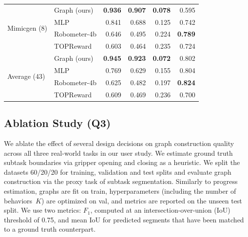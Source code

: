 \documentclass[letterpaper, 10 pt, conference]{ieeeconf}
\begin{document}
\begin{table}
\begin{tabular}{@{}llrrrr@{}}
  \midrule
  \multirow{4}{*}{Mimicgen (8)}      & Graph (ours) & \textbf{0.936} & \textbf{0.907} & \textbf{0.078} & 0.595 \\
                                     & MLP        & 0.841          & 0.688          & 0.125          & 0.742 \\
                                     & Robometer-4b       & 0.646          & 0.495          & 0.224          & \textbf{0.789} \\
                                     & TOPReward          & 0.603          & 0.464          & 0.235          & 0.724 \\
  \midrule
  \midrule
  \multirow{4}{*}{Average (43)}    & Graph (ours) & \textbf{0.945} & \textbf{0.923} & \textbf{0.072} & 0.802 \\
                                   & MLP        & 0.769          & 0.629          & 0.155          & 0.804 \\
                                   & Robometer-4b       & 0.625          & 0.482          & 0.197          & \textbf{0.824} \\
                                   & TOPReward          & 0.609          & 0.469          & 0.236          & 0.700 \\
  \bottomrule
  \end{tabular}
\end{table}



\subsection{Ablation Study (Q3)}

We ablate the effect of several design decisions on graph construction quality across all three real-world tasks in our user study. We estimate ground truth subtask boundaries via gripper opening and closing as a heuristic. We split the datasets 60/20/20 for training, validation and test splits and evaluate graph construction via the proxy task of subtask segmentation. Similarly to progress estimation, graphs are fit on train, hyperparameters (including the number of behaviors~\(K\)) are optimized on val, and metrics are reported on the unseen test split. We use two metrics: \(F_1\), computed at an intersection-over-union (IoU) threshold of 0.75, and mean IoU for predicted segments that have been matched to a ground truth counterpart.
\end{document}
